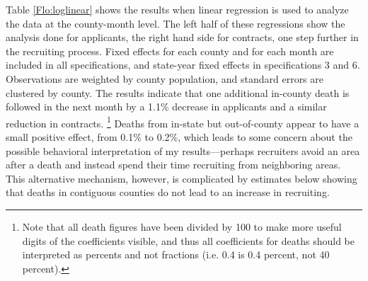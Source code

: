 \documentclass[12pt] {article}
\begin{document}
\begin{table}
\caption{}
\label{Flo:loglinear}
\scalebox{0.9}{

}
\end{table}


Table \ref{Flo:loglinear}
shows the results when linear regression is used to analyze the data
at the county-month level. The left half of these regressions show the analysis done for applicants, the right hand side for contracts, one step further in the recruiting
process. %
Fixed effects for each county and for each month are included in all specifications, and state-year fixed effects  in specifications 3 and 6.
Observations are weighted by county population, and standard errors
are clustered by county. The results indicate that one additional
in-county death is followed in the next month by a 1.1\%
decrease in applicants and a similar reduction in contracts.
\footnote{Note that all death figures have been divided by 100 to make more
useful digits of the coefficients visible, and thus all coefficients
for deaths should be interpreted as percents and not fractions (i.e.
0.4 is 0.4 percent, not 40 percent).} Deaths from in-state but out-of-county
appear to have a small positive effect, from 0.1\% to 0.2\%, which leads to some concern about the possible behavioral interpretation of my results---perhaps recruiters avoid an area after a death and instead spend their time recruiting from neighboring areas. This alternative mechanism, however, is complicated by estimates below showing that deaths in contiguous counties do not lead to an increase in recruiting. 
\end{document}
